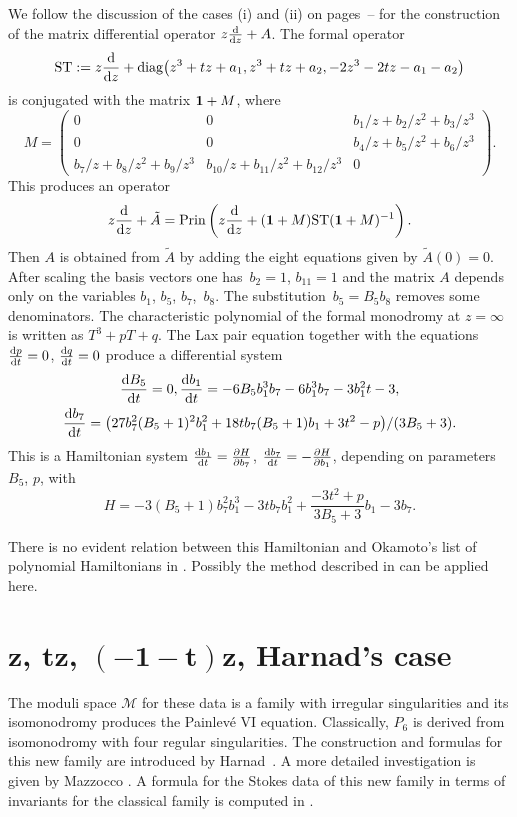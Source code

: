 \documentclass[pdftex]{sigma}
\numberwithin{equation}{section}
\begin{document}
We follow the discussion of the cases (i) and (ii) on pages~\pageref{(i)}--\pageref{(ii)} for the construction of the matrix differential operator $z\frac{{\rm d}}{{\rm d}z}+A$.
The formal operator
\[
{\rm ST}:=z\frac{{\rm d}}{{\rm d}z}+\operatorname{diag}\bigl(z^3+tz+a_1,z^3+tz+a_2,-2z^3-2tz-a_1-a_2\bigr)
\]
 is conjugated with
the matrix ${\bf 1}+M$, where
\[ M=\begin{pmatrix} 0&0 & b_1/z + b_2/z^2 + b_3/z^3\\
0 &0 & b_4/z + b_5/z^2 + b_6/z^3 \\
b_7/z + b_8/z^2 + b_9/z^3 &b_{10}/z + b_{11}/z^2 + b_{12}/z^3 &0 \end{pmatrix}.\]
This produces an operator
\[
z\frac{{\rm d}}{{\rm d}z}+\tilde{A} = \operatorname{Prin}\left( z\frac{{\rm d}}{{\rm d}z}+( {\bf 1}+M){\rm ST}({\bf 1}+M)^{-1}\right).
\]
Then $A$ is obtained from $\tilde{A}$
by adding the eight equations given by $\tilde{A}(0)=0$. After scaling the basis vectors one has~${b_2=1}$, $b_{11}=1$ and the matrix
$A$ depends only on the variables $b_1$, $b_5$, $b_7$,~$b_8$. The substitution~${b_5=B_5b_8}$ removes some denominators.
The characteristic polynomial of the formal monodromy at $z=\infty$ is written as $T^3+pT+q$.
The Lax pair equation
together with the equations $\frac{{\rm d}p}{{\rm d}t}=0$, $\frac{{\rm d}q}{{\rm d}t}=0$ produce a differential system
\begin{gather*} \frac{{\rm d}B_5}{{\rm d}t}=0, \frac{{\rm d}b_1}{{\rm d}t}= -6B_5b_1^3b_7 - 6b_1^3b_7 - 3b_1^2t - 3, \\
\frac{{\rm d}b_7}{{\rm d}t}=\bigl(27b_7^2(B_5 + 1)^2b_1^2 + 18tb_7(B_5 + 1)b_1 + 3t^2 - p\bigr)/(3B_5 + 3) .\end{gather*}
This is a Hamiltonian system
$\frac{{\rm d}b_1}{{\rm d}t}=\frac{\partial H}{\partial b_7}$, $\frac{{\rm d}b_7}{{\rm d}t}=-\frac{\partial H}{\partial b_1}$,
depending on parameters $B_5$, $p$, with
\[
H=-3(B_5 +1)b_7^2b_1^3 - 3tb_7b_1^2 + \frac{-3t^2 + p}{3B_5 + 3} b_1 - 3b_7.
\]

There is no evident relation between this Hamiltonian and Okamoto's list of polynomial
Hamiltonians in \cite{O1}. Possibly the method described in \cite{D-F-L-S} can be applied here.

 \section[z, tz, (-1-t)z, J.~Harnad's case ]{$\boldsymbol{z}$, $\boldsymbol{tz}$, $\boldsymbol{(-1-t)z}$, Harnad's case}\label{seven}
The moduli space $\mathcal{M}$ for these data is a family with irregular singularities and its isomonodromy produces
the Painlev\'e VI equation. Classically, $P_6$ is derived from isomonodromy with four regular singularities.
The construction and formulas for this new family are introduced by Harnad~\cite{H}. A more detailed investigation
 is given by Mazzocco \cite{Maz}. A formula for the Stokes data of this new family in terms of
 invariants for the classical family is computed in \cite{D-G}.
\end{document}
